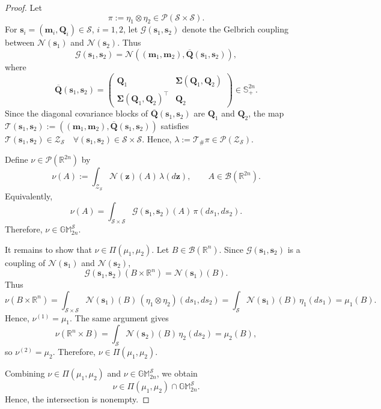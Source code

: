 \documentclass[10pt,a4paper]{amsart}
\newcommand{\bQ}{\bm Q}
\newcommand{\bSigma}{\bm{\Sigma}}
\newcommand{\bmean}{\bm{m}}
\newcommand{\bs}{\bm{s}}
\newcommand{\bz}{\bm{z}}
\newcommand{\mN}{\mathcal{N}}
\newcommand{\mbGM}{\mathbb{GM}}
\newcommand{\mbR}{\mathbb R}
\newcommand{\mbS}{\mathbb S}
\begin{document}
\begin{proof}
Let\vspace{-2em}
\[
\pi:=\eta_1\otimes\eta_2\in\mathcal P(\mathcal S\times\mathcal S).
\]
For \(\bs_i=(\bmean_i,\bQ_i)\in\mathcal S\), \(i=1,2\), let
\(\mathcal G(\bs_1,\bs_2)\) denote the Gelbrich coupling between
\(\mN(\bs_1)\) and \(\mN(\bs_2)\). Thus
\[
\mathcal G(\bs_1,\bs_2)
=
\mN\!\left(
(\bmean_1,\bmean_2),
\overline{\bQ}(\bs_1,\bs_2)
\right),
\]
where\vspace{-1.75em}
\[
\overline{\bQ}(\bs_1,\bs_2)
=
\begin{pmatrix}
\bQ_1 & \bSigma(\bQ_1,\bQ_2)\\
\boldsymbol\Sigma(\bQ_1,\bQ_2)^\top & \bQ_2
\end{pmatrix}
\in\mbS^{2n}_+.
\]
Since the diagonal covariance blocks of \(\overline{\bQ}(\bs_1,\bs_2)\) are
\(\bQ_1\) and \(\bQ_2\), the map $\mathcal T(\bs_1,\bs_2)
:=
\left(
(\bmean_1,\bmean_2),
\overline{\bQ}(\bs_1,\bs_2)
\right)$ satisfies $\mathcal T(\bs_1,\bs_2)\in\mathcal Z_{\mathcal S}
\quad
\forall (\bs_1,\bs_2)\in\mathcal S\times\mathcal S$. Hence, $\lambda:=\mathcal T_{\#}\pi\in\mathcal P(\mathcal Z_{\mathcal S})$. 

Define \(\nu\in\mathcal P(\mbR^{2n})\) by
\[
\nu(A):=\int_{\mathcal Z_{\mathcal S}}\mN(\bz)(A)\,\lambda(d\bz),
\qquad
A\in\mathcal B(\mbR^{2n}).
\]
Equivalently,
\[
\nu(A)
=
\int_{\mathcal S\times\mathcal S}
\mathcal G(\bs_1,\bs_2)(A)\,\pi(ds_1,ds_2).
\]
Therefore, \(\nu\in\mbGM_{2n}^{\mathcal S}\).

It remains to show that \(\nu\in\Pi(\mu_1,\mu_2)\). Let
\(B\in\mathcal B(\mbR^n)\). Since \(\mathcal G(\bs_1,\bs_2)\) is a coupling of
\(\mN(\bs_1)\) and \(\mN(\bs_2)\),
\[
\mathcal G(\bs_1,\bs_2)(B\times\mbR^n)
=
\mN(\bs_1)(B).
\]
Thus\vspace{-1.85em}
\[
\nu(B\times\mbR^n)
=
\int_{\mathcal S\times\mathcal S}
\mN(\bs_1)(B)\,(\eta_1\otimes\eta_2)(ds_1,ds_2)
=
\int_{\mathcal S}\mN(\bs_1)(B)\,\eta_1(ds_1)
=
\mu_1(B).
\]
Hence, \(\nu^{(1)}=\mu_1\). The same argument gives
\[
\nu(\mbR^n\times B)
=
\int_{\mathcal S}\mN(\bs_2)(B)\,\eta_2(ds_2)
=
\mu_2(B),
\]
so \(\nu^{(2)}=\mu_2\). Therefore, \(\nu\in\Pi(\mu_1,\mu_2)\).

Combining \(\nu\in\Pi(\mu_1,\mu_2)\) and
\(\nu\in\mbGM_{2n}^{\mathcal S}\), we obtain
\[
\nu\in\Pi(\mu_1,\mu_2)\cap\mbGM_{2n}^{\mathcal S}.
\]
Hence, the intersection is nonempty.
\end{proof}
\end{document}
